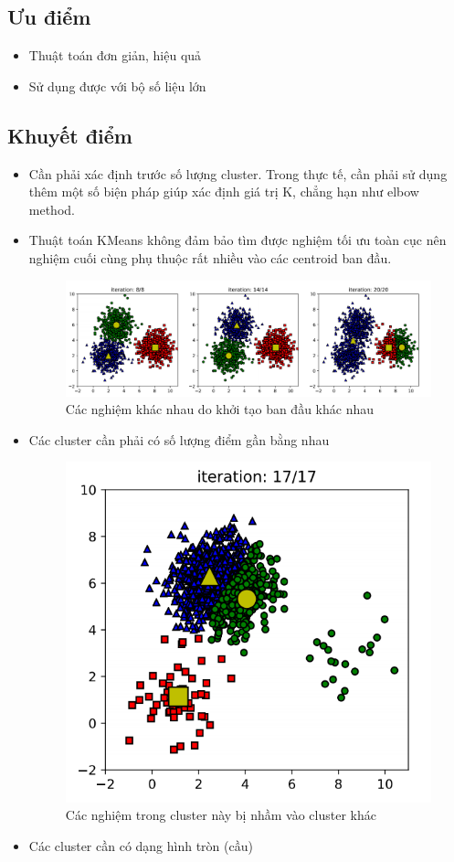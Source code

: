 \subsection{Ưu điểm}
\begin{itemize}
	\item Thuật toán đơn giản, hiệu quả
	\item Sử dụng được với bộ số liệu lớn
\end{itemize}
\subsection{Khuyết điểm}
\begin{itemize}
	\item Cần phải xác định trước số lượng cluster. Trong thực tế, cần phải sử dụng thêm một số biện pháp giúp xác định giá trị K, chẳng hạn như elbow method.
	\item Thuật toán KMeans không đảm bảo tìm được nghiệm tối ưu toàn cục nên nghiệm cuối cùng phụ thuộc rất nhiều vào các centroid ban đầu.\\
	\begin{figure}[h]
		\centering
		\includegraphics[width=0.7\linewidth]{img/disad_1}
		\caption{Các nghiệm khác nhau do khởi tạo ban đầu khác nhau}
	\end{figure}
	\item Các cluster cần phải có số lượng điểm gần bằng nhau\\
	\begin{figure}[h]
		\centering
		\includegraphics[width=0.3\linewidth]{img/disad_2}
		\caption{Các nghiệm trong cluster này bị nhầm vào cluster khác}
	\end{figure}
	\item Các cluster cần có dạng hình tròn (cầu)	
	\begin{figure}[h]

\end{figure}
\end{itemize}
